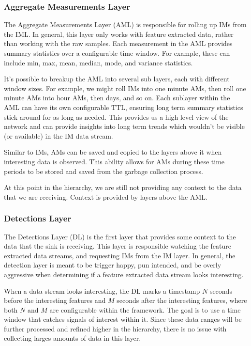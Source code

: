 \subsubsection{Aggregate Measurements Layer}
The Aggregate Measurements Layer (AML) is responsible for rolling up IMs from the IML. In general, this layer only works with feature extracted data, rather than working with the raw samples. Each measurement in the AML provides summary statistics over a configurable time window. For example, these can include min, max, mean, median, mode, and variance statistics. 

It's possible to breakup the AML into several sub layers, each with different window sizes. For example, we might roll IMs into one minute AMs, then roll one minute AMs into hour AMs, then days, and so on. Each sublayer within the AML can have its own configurable TTL, ensuring long term summary statistics stick around for as long as needed. This provides us a high level view of the network and can provide insights into long term trends which wouldn't be visible (or available) in the IM data stream.

Similar to IMs, AMs can be saved and copied to the layers above it when interesting data is observed. This ability allows for AMs during these time periods to be stored and saved from the garbage collection process.

At this point in the hierarchy, we are still not providing any context to the data that we are receiving. Context is provided by layers above the AML.

\subsubsection{Detections Layer}
The Detections Layer (DL) is the first layer that provides some context to the data that the sink is receiving. This layer is responsible watching the feature extracted data streams, and requesting IMs from the IM layer. In general, the detection layer is meant to be trigger happy, pun intended, and be overly aggressive when determining if a feature extracted data stream looks interesting. 

When a data stream looks interesting, the DL marks a timestamp $N$ seconds before the interesting features and $M$ seconds after the interesting features, where both $N$ and $M$ are configurable within the framework. The goal is to use a time window that catches signals of interest within it. Since these data ranges will be further processed and refined higher in the hierarchy, there is no issue with collecting larges amounts of data in this layer. 

